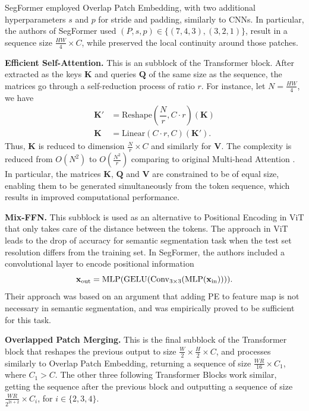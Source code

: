 SegFormer employed Overlap Patch Embedding, with two additional hyperparameters $s$ and $p$ for stride and padding, similarly to CNNs. In particular, the authors of SegFormer used $(P,s,p)\in\{(7,4,3), (3,2,1)\}$, result in a sequence size $\frac{HW}{4} \times C$, while preserved the local continuity around those patches.

\textbf{Efficient Self-Attention.} This is an subblock of the Transformer block. After extracted as the keys $\mathbf{K}$ and queries $\mathbf{Q}$ of the same size as the sequence, the matrices go through a self-reduction process of ratio $r$. For instance, let $N=\frac{HW}{4}$, we have
\begin{align*}
  \mathbf{K'} & = \mathrm{Reshape}\left(\dfrac{N}{r}, C\cdot r\right)(\mathbf{K}) \\
  \mathbf{K}  & = \mathrm{Linear}\left(C\cdot r, C\right)(\mathbf{K'}).
\end{align*}
Thus, $\mathbf{K}$ is reduced to dimension $\frac{N}{r}\times C$ and similarly for $\mathbf{V}$. The complexity is reduced from $O(N^2)$ to $O\left(\frac{N^2}{r}\right)$ comparing to original Multi-head Attention \cite{xie2021segformer}. In particular, the matrices $\mathbf{K}$, $\mathbf{Q}$ and $\mathbf{V}$ are constrained to be of equal size, enabling them to be generated simultaneously from the token sequence, which results in improved computational performance.

\textbf{Mix-FFN.} This subblock is used as an alternative to Positional Encoding in ViT that only takes care of the distance between the tokens. The approach in ViT leads to the drop of accuracy for semantic segmentation task when the test set resolution differs from the training set. In SegFormer, the authors included a convolutional layer to encode positional information
$$\mathbf{x}_{\mathrm{out}} = \mathrm{MLP}(\mathrm{GELU}(\mathrm{Conv_{3\times 3}(\mathrm{MLP}(\mathbf{x}_{in}))})).$$
Their approach was based on an argument that adding PE to feature map is not necessary in semantic segmentation, and was empirically proved to be sufficient for this task. 


\textbf{Overlapped Patch Merging.} This is the final subblock of the Transformer block that reshapes the previous output to size $\frac{W}{2}\times \frac{H}{2} \times C$, and processes similarly to Overlap Patch Embedding, returning a sequence of size $\frac{WR}{16}\times C_1$, where $C_1>C$. The other three following Transformer Blocks work similar, getting the sequence after the previous block and outputting a sequence of size $\frac{WR}{2^{2i+2}}\times C_i$, for $i\in\{2,3,4\}$.

